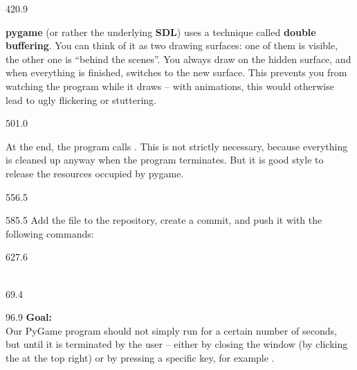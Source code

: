 \documentclass{aslab}
\begin{document}
\begin{region}[pitch=13.46]{420.9}
\begin{dashlist}
\item \textbf{pygame} (or rather the underlying \textbf{SDL}) uses a
  technique called \textbf{double buffering}. You can think of it as two
  drawing surfaces: one of them is visible, the other one is ``behind the
  scenes''. You always draw on the hidden surface, and when everything is
  finished,  switches to the new surface. This
  prevents you from watching the program while it draws -- with
  animations, this would otherwise lead to ugly flickering or stuttering.
\end{dashlist}
\end{region}

\begin{region}[pitch=13.55]{501.0}
\begin{dashlist}
\item At the end, the program calls . This is not
  strictly necessary, because everything is cleaned up anyway when the
  program terminates. But it is good style to release the resources
  occupied by pygame.
\end{dashlist}
\end{region}

\begin{region}{556.5}
\end{region}

\begin{region}[pitch=14.3]{585.5}
Add the file to the repository, create a commit, and push it with the
following commands:
\end{region}

\begin{region}[pitch=13.2]{627.6}
\\
\\
\end{region}

\nextpage
\begin{region}{69.4}
\end{region}

\begin{region}[pitch=13.4]{96.9}
\textbf{Goal:}\\
Our PyGame program should not simply run for a certain number of seconds,
but until it is terminated by the user -- either by closing the window (by
clicking the  at the top right) or by pressing a specific key, for
example .
\end{region}
\end{document}
